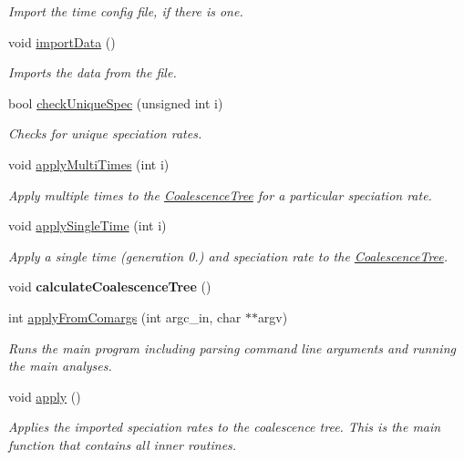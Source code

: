 \begin{DoxyCompactItemize}
\begin{DoxyCompactList}\small\item\em Import the time config file, if there is one. \end{DoxyCompactList}\item 
void \hyperlink{class_apply_spec_ae770cc724faa7c282dacaa4f3bc09adc}{import\+Data} ()\hypertarget{class_apply_spec_ae770cc724faa7c282dacaa4f3bc09adc}{}\label{class_apply_spec_ae770cc724faa7c282dacaa4f3bc09adc}

\begin{DoxyCompactList}\small\item\em Imports the data from the file. \end{DoxyCompactList}\item 
bool \hyperlink{class_apply_spec_a77665d4d5bf577447f107c444ffe8906}{check\+Unique\+Spec} (unsigned int i)
\begin{DoxyCompactList}\small\item\em Checks for unique speciation rates. \end{DoxyCompactList}\item 
void \hyperlink{class_apply_spec_aaea15ee26283e352351927b62accf722}{apply\+Multi\+Times} (int i)
\begin{DoxyCompactList}\small\item\em Apply multiple times to the \hyperlink{class_tree}{CoalescenceTree} for a particular speciation rate. \end{DoxyCompactList}\item
void \hyperlink{class_apply_spec_a322f10a8292ed3a6b1b9975b056c3ac0}{apply\+Single\+Time} (int i)
\begin{DoxyCompactList}\small\item\em Apply a single time (generation 0.) and speciation rate to the \hyperlink{class_tree}{CoalescenceTree}. \end{DoxyCompactList}\item
void {\bfseries calculate\+CoalescenceTree} ()\hypertarget{class_apply_spec_a3c7e603e0357515c50aaacab451fe389}{}\label{class_apply_spec_a3c7e603e0357515c50aaacab451fe389}

\item 
int \hyperlink{class_apply_spec_ae229befb55638433bd1f6d99cb29c70d}{apply\+From\+Comargs} (int argc\+\_\+in, char $\ast$$\ast$argv)
\begin{DoxyCompactList}\small\item\em Runs the main program including parsing command line arguments and running the main analyses. \end{DoxyCompactList}\item 
void \hyperlink{class_apply_spec_a1cb7d5f351ea9e85d34c2afe79f9faae}{apply} ()\hypertarget{class_apply_spec_a1cb7d5f351ea9e85d34c2afe79f9faae}{}\label{class_apply_spec_a1cb7d5f351ea9e85d34c2afe79f9faae}

\begin{DoxyCompactList}\small\item\em Applies the imported speciation rates to the coalescence tree. This is the main function that contains all inner routines. \end{DoxyCompactList}\end{DoxyCompactItemize}


